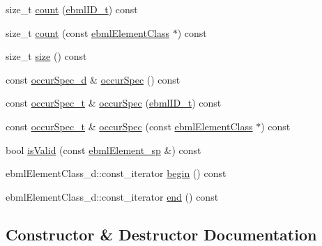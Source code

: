 \begin{DoxyCompactItemize}
\item 
size\+\_\+t \mbox{\hyperlink{classebml_1_1childClassSpec__t_a9a55992a46e3da6d3e637c2dc32c8226}{count}} (\mbox{\hyperlink{namespaceebml_a86c5f604ddf12a74aa9812e997a58691}{ebml\+I\+D\+\_\+t}}) const
\item 
size\+\_\+t \mbox{\hyperlink{classebml_1_1childClassSpec__t_af82cf4975b558a27b208b2f9fbb3d694}{count}} (const \mbox{\hyperlink{classebml_1_1ebmlElementClass}{ebml\+Element\+Class}} $\ast$) const
\item 
size\+\_\+t \mbox{\hyperlink{classebml_1_1childClassSpec__t_a9432bd5e3ea363d4fb4ff4e1c0336f7b}{size}} () const
\item 
const \mbox{\hyperlink{namespaceebml_a1cd7dafb7e8e8975fecc4a11ef03c5be}{occur\+Spec\+\_\+d}} \& \mbox{\hyperlink{classebml_1_1childClassSpec__t_a04950228350dfc2fc9949c67e66d1bdc}{occur\+Spec}} () const
\item 
const \mbox{\hyperlink{structebml_1_1occurSpec__t}{occur\+Spec\+\_\+t}} \& \mbox{\hyperlink{classebml_1_1childClassSpec__t_ac25a61d6ae835821a2b59a8edfa5e8ff}{occur\+Spec}} (\mbox{\hyperlink{namespaceebml_a86c5f604ddf12a74aa9812e997a58691}{ebml\+I\+D\+\_\+t}}) const
\item 
const \mbox{\hyperlink{structebml_1_1occurSpec__t}{occur\+Spec\+\_\+t}} \& \mbox{\hyperlink{classebml_1_1childClassSpec__t_a7a7b1530216bb3a3a7d49251f94dc729}{occur\+Spec}} (const \mbox{\hyperlink{classebml_1_1ebmlElementClass}{ebml\+Element\+Class}} $\ast$) const
\item 
bool \mbox{\hyperlink{classebml_1_1childClassSpec__t_adf50592c52a1b42f2162e975bf82ad27}{is\+Valid}} (const \mbox{\hyperlink{namespaceebml_adad533b7705a16bb360fe56380c5e7be}{ebml\+Element\+\_\+sp}} \&) const
\item 
ebml\+Element\+Class\+\_\+d\+::const\+\_\+iterator \mbox{\hyperlink{classebml_1_1childClassSpec__t_a2d2e39e076f0801465d1a72f227bdd59}{begin}} () const
\item 
ebml\+Element\+Class\+\_\+d\+::const\+\_\+iterator \mbox{\hyperlink{classebml_1_1childClassSpec__t_ab2bdc87fcf5681a4018b21fb0887ef0e}{end}} () const
\end{DoxyCompactItemize}


\subsection{Constructor \& Destructor Documentation}
\mbox{\label{classebml_1_1childClassSpec__t_aa6909da591d9b10da355f7f0f44e21e6}} 
